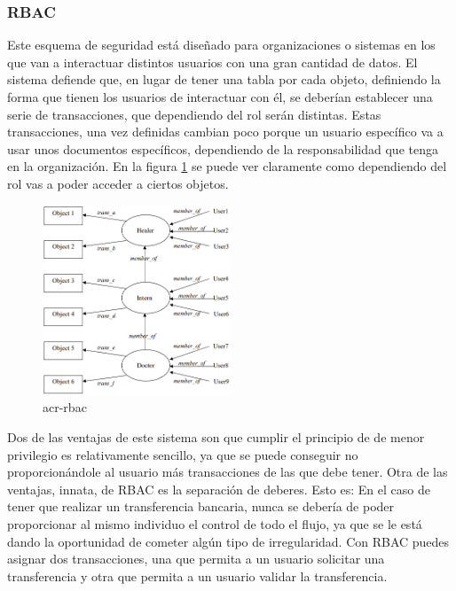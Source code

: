 \documentclass[titlepage, 12pt, a4paper]{article}
\begin{document}
\subsubsection{\gls{RBAC}}
Este esquema de seguridad está diseñado para organizaciones o sistemas en los que van a interactuar distintos usuarios con una gran cantidad de datos. El sistema defiende que, en lugar de tener una tabla por cada objeto, definiendo la forma que tienen los usuarios de interactuar con él, se deberían establecer una serie de transacciones, que dependiendo del rol serán distintas. Estas transacciones, una vez definidas cambian poco porque un usuario específico va a usar unos documentos específicos, dependiendo de la responsabilidad que tenga en la organización. En la figura \ref{fig:RBAC} se puede ver claramente como dependiendo del rol vas a poder acceder a ciertos objetos.
\begin{figure}[H]
    \centering
    \includegraphics[width=0.5\textwidth]{Media/RBAC.PNG}
    \caption{\gls{acr-rbac}}
    \label{fig:RBAC}
\end{figure}
Dos de las ventajas de este sistema son que cumplir el principio de de menor privilegio es relativamente sencillo, ya que se puede conseguir no proporcionándole  al usuario más transacciones de las que debe tener. Otra de las ventajas, innata, de \gls{RBAC} es la separación de deberes. Esto es: En el caso de tener que realizar un transferencia bancaria, nunca se debería de poder proporcionar al mismo individuo el control de todo el flujo, ya que se le está dando la oportunidad de cometer algún tipo de irregularidad. Con RBAC puedes asignar dos transacciones, una que permita a un usuario solicitar una transferencia y otra que permita a un usuario validar la transferencia.
\end{document}
